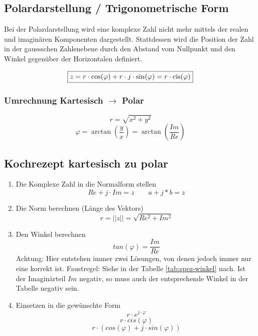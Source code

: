 \subsection{Polardarstellung / Trigonometrische Form}
Bei der Polardarstellung wird eine komplexe Zahl nicht mehr mittels der realen 
und imaginären Komponenten dargestellt. Stattdessen wird die Position der Zahl 
in der gaussschen Zahlenebene durch den Abstand vom Nullpunkt und den Winkel 
gegenüber der Horizontalen definiert. 
\begin{center}
\end{center}
\[ \boxed{z = r \cdot \cos(\varphi) + r \cdot j \cdot \sin(\varphi) 
= r \cdot \operatorname{cis}(\varphi)} \]

\subsubsection{Umrechnung Kartesisch $\rightarrow$ Polar}
\[ \boxed{r = \sqrt{x^2 + y^2}} \]
\[ \boxed{\varphi = \arctan{\left(\frac{y}{x}\right)} = 
          \arctan{\left(\frac{Im}{Re}\right)}} \]
\subsection{Kochrezept kartesisch zu polar}
\begin{enumerate}
	\item Die Komplexe Zahl in die Normalform stellen 
		\[ Re + j\cdot Im = z \qquad a + j*b = z \]
	\item Die Norm berechnen (Länge des Vektors)
		\[ r=||z||=\sqrt{Re^2+Im^2} \]
	\item Den Winkel berechnen
		\[ tan(\varphi)=\frac{Im}{Re} \]
		Achtung: Hier entstehen immer zwei Lösungen, von denen jedoch
		immer nur eine korrekt ist.
		Faustregel: Siehe in der Tabelle \ref{tab:spez-winkel} nach. 
		Ist der Imaginärteil $Im$ negativ, so muss auch der entsprechende
		Winkel in der Tabelle negativ sein.
	\item Einsetzen in die gewünschte Form
		\[ r \cdot e^{j\cdot\varphi} \]
		\[ r \cdot cis(\varphi) \]
		\[ r \cdot (cos(\varphi) + j \cdot sin(\varphi)) \]
\end{enumerate}


